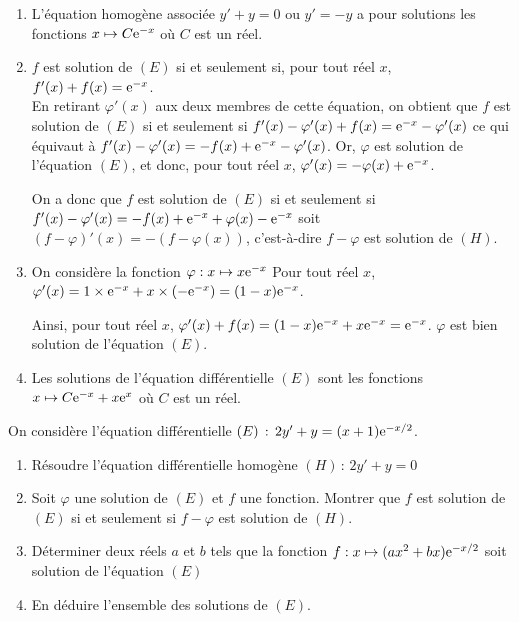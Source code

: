\documentclass[11pt,fleqn, openany]{book} %
\begin{document}
\begin{solution}\hspace{0pt}

\begin{enumerate}\item L'équation homogène associée \(y'+y=0\) ou \(y'=-y\) a pour solutions les fonctions \(x\mapsto C\mathrm{e}^{-x}\) où \(C\) est un réel.

	\item \(f\) est solution de \((E)\) si et seulement si, pour tout réel \(x\), \(f'(x)+f(x)=\mathrm{e}^{-x}\). \\ En retirant \(\varphi'(x)\) aux deux membres de cette équation, on obtient que \(f\) est solution de \((E)\) si et seulement si \(f'(x)-\varphi '(x)+f(x)=\mathrm{e}^{-x}-\varphi '(x)\) ce qui équivaut à \(f'(x)-\varphi '(x)=-f(x)+\mathrm{e}^{-x}-\varphi '(x)\). Or, \(\varphi\) est solution de l'équation \((E)\), et donc, pour tout réel \(x\), \(\varphi' (x) = -\varphi (x)+\mathrm{e}^{-x}\).

	On a donc que \(f\) est solution de \((E)\) si et seulement si \(f'(x)-\varphi '(x)=-f(x)+\mathrm{e}^{-x}+\varphi (x)-\mathrm{e}^{-x}\) soit \((f-\varphi)'(x) = - (f-\varphi(x))\), c'est-à-dire \(f-\varphi\) est solution de \((H)\).
\item On considère la fonction \(\varphi:x\mapsto x\mathrm{e}^{-x}\) Pour tout réel \(x\), $\varphi'(x)=1 \times \mathrm{e}^{-x}+x\times (-\mathrm{e}^{-x})=(1-x)\mathrm{e}^{-x}$.

Ainsi, pour tout réel \(x\), $\varphi'(x)+f(x)=(1-x)\mathrm{e}^{-x}+x\mathrm{e}^{-x}=\mathrm{e}^{-x}$. \(\varphi\) est bien solution de l'équation \((E)\).
\item  Les solutions de l'équation différentielle \((E)\) sont les fonctions \(x\mapsto C\mathrm{e}^{-x}+x\mathrm{e}^{x}\) où \(C\) est un réel.\end{enumerate}

 \end{solution}
 
 

\begin{exercise}[topic=diff03]On considère l'équation différentielle $(E)\, :\, 2y'+y=(x+1)\mathrm{e}^{-x/2}$.
\begin{enumerate}
\item Résoudre l'équation différentielle homogène $(H) \,:\, 2y'+y=0$
\item Soit $\varphi$ une solution de $(E)$ et $f$ une fonction. Montrer que $f$ est solution de $(E)$ si et seulement si $f-\varphi$ est solution de $(H)$.
\item Déterminer deux réels $a$ et $b$ tels que la fonction $f:x\mapsto (ax^2+bx)\mathrm{e}^{-x/2}$ soit solution de l'équation $(E)$
\item En déduire l'ensemble des solutions de $(E)$.
\end{enumerate}\end{exercise}
\end{document}
